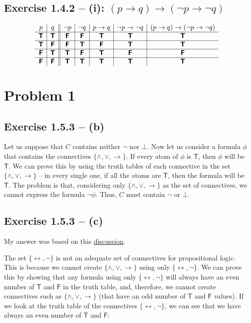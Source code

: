 \documentclass[11pt]{article}
\newcommand{\TTT}{\bm{\mathsf{T}}}
\newcommand{\FFF}{\bm{\mathsf{F}}}
\begin{document}
\subsection*{Exercise 1.4.2 -- (i): $(p \to q) \to (\neg{p} \to \neg{q})$}
\[
\begin{array}{ c | c || c | c | c | c | c}
 p & q & \neg{p} & \neg{q}& p \to q & \neg{p} \to \neg{q} & (p \to q) \to (\neg{p} \to \neg{q})
\\ \hline 
 \TTT & \TTT & \FFF & \FFF & \TTT & \TTT & \TTT \\ \hline  
 \TTT & \FFF & \FFF & \TTT & \FFF & \TTT & \TTT \\ \hline  
 \FFF & \TTT & \TTT & \FFF & \TTT & \FFF & \FFF \\ \hline  
 \FFF & \FFF & \TTT & \TTT & \TTT & \TTT & \TTT
\end{array}
\]

\section*{Problem 1}

\subsection*{Exercise 1.5.3 -- (b)}
Let us suppose that $C$ contains neither $\lnot$ nor $\bot$. Now let us consider a formula $\phi$ that contains the connectives $\{\land, \lor, \to\}$. If every atom of $\phi$ is $\TTT$, then $\phi$ will be $\TTT$. We can prove this by using the truth tables of each connective in the set $\{\land, \lor, \to\}$ -- in every single one, if all the atoms are $\TTT$, then the formula will be $\TTT$. The problem is that, considering only $\{\land, \lor, \to\}$ as the set of connectives, we cannot express the formula $\neg{\phi}$. Thus, $C$ must contain $\neg$ or $\bot$.


\subsection*{Exercise 1.5.3 -- (c)}
My answer was based on this \href{https://math.stackexchange.com/questions/191146/prove-that-a-set-of-connectives-is-inadequate/192277#192277}{discussion}.

The set $\{\leftrightarrow, \neg\}$ is not an adequate set of connectives for propositional logic. This is because we cannot create $\{\land, \lor, \to\}$ using only $\{\leftrightarrow, \neg\}$. We can prove this by showing that any formula using only $\{\leftrightarrow, \neg\}$ will always have an even number of $\TTT$ and $\FFF$ in the truth table, and, therefore, we cannot create connectives such as $\{\land, \lor, \to\}$ (that have an odd number of $\TTT$ and $\FFF$ values). If we look at the truth table of the connectives $\{\leftrightarrow, \neg\}$, we can see that we have always an even number of $\TTT$ and $\FFF$:
\end{document}
